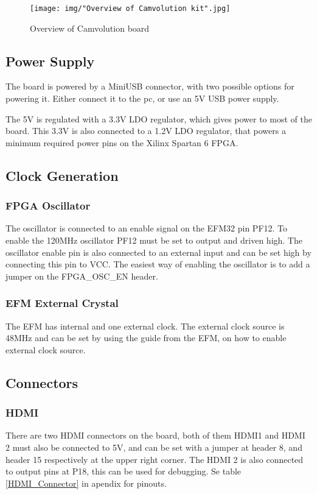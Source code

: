 \begin{figure}
    \texttt{[image: img/"Overview of Camvolution kit".jpg]}
    \caption{Overview of Camvolution board}
    \label{fig:BoardLayout}
\end{figure}

\subsection{Power Supply}
The board is powered by a MiniUSB connector, with two possible options for powering it. Either connect it to the pc, or use an 5V USB power supply.

The 5V is regulated with a 3.3V LDO regulator, which gives power to most of the board. This 3.3V is also connected to a 1.2V LDO regulator, that powers a minimum required power pins on the Xilinx Spartan 6 FPGA. 

\subsection{Clock Generation}
\subsubsection{FPGA Oscillator}The oscillator is connected to an enable signal on the EFM32 pin PF12. To enable the 120MHz oscillator PF12 must be set to output and driven high. The oscillator enable pin is also connected to an external input and can be set high by connecting this pin to VCC. The easiest way of enabling the oscillator is to add a jumper on the FPGA\_OSC\_EN header.

\subsubsection{EFM External Crystal}
The EFM has internal and one external clock. The external clock source is 48MHz and can be set by using the guide from the EFM, on how to enable external clock source. 
\subsection{Connectors}
\subsubsection{HDMI}
There are two HDMI connectors on the board, both of them HDMI1 and HDMI 2 must also be connected to 5V, and can be set with a jumper at header 8, and header 15 respectively at the upper right corner. The HDMI 2 is also connected to output pins at P18, this can be used for debugging. Se table \ref{HDMI_Connector} in apendix for pinouts.

